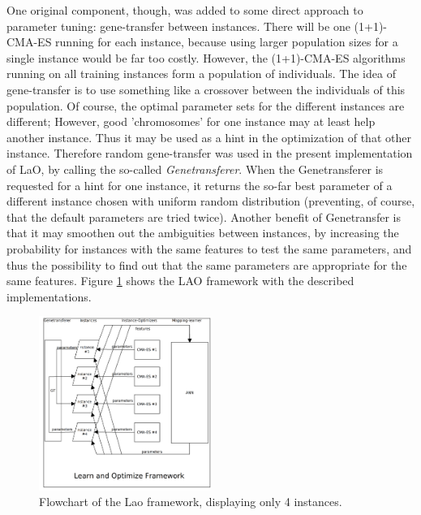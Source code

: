 \documentclass[runningheads,a4paper]{llncs}
\begin{document}
One original component, though, was added to some direct approach to parameter tuning: gene-transfer between instances. There will be one (1+1)-CMA-ES running for each instance, because using larger population sizes for a single instance would be far too costly. However, the (1+1)-CMA-ES algorithms running on all training instances form a population of individuals. The idea of gene-transfer is to use something like a crossover between the individuals of this population. Of course, the optimal parameter sets for the different instances are different; However, good 'chromosomes' for one instance may at least help another instance. Thus it may be used as a hint in the optimization of that other instance. Therefore random gene-transfer was used in the present implementation of LaO, by calling the so-called {\em Genetransferer}. When the Genetransferer is requested for a hint for one instance, it returns the so-far best parameter of a different instance chosen with uniform random distribution (preventing, of course, that the default parameters are tried twice). Another benefit of Genetransfer is that it may smoothen out the ambiguities between instances, by increasing the probability for instances with the same features to test the same parameters, and thus the possibility to find out that the same parameters are appropriate for the same features. Figure \ref{figure:laoflowchart} shows the LAO framework with the described implementations.

\begin{figure}[h!]
  \centering
    \includegraphics[width=0.5\textwidth]{lao.png}
  \caption{Flowchart of the Lao framework, displaying only 4 instances.}
\label{figure:laoflowchart}
\end{figure}
\end{document}
